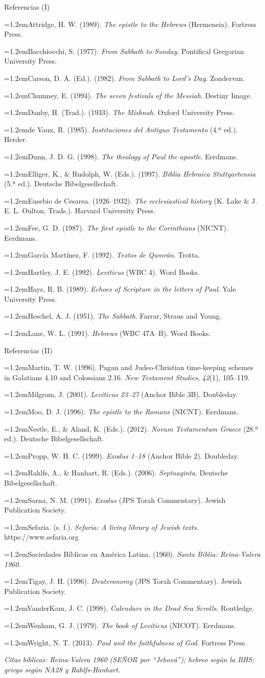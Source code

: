 \documentclass[hyperref={bookmarks=false},aspectratio=169]{beamer}
\newcommand{\SENOR}{S{\fontsize{0.78em}{1em}\selectfont EÑOR}}
\newcommand{\refapa}[1]{\par{\RaggedRight\hangindent=1.2em\hangafter=1\noindent #1\par}\vspace{3pt}}
\begin{document}
\begin{frame}{Referencias (I)}
\tiny
\refapa{Attridge, H. W. (1989). \emph{The epistle to the Hebrews} (Hermeneia). Fortress Press.}
\refapa{Bacchiocchi, S. (1977). \emph{From Sabbath to Sunday}. Pontifical Gregorian University Press.}
\refapa{Carson, D. A. (Ed.). (1982). \emph{From Sabbath to Lord's Day}. Zondervan.}
\refapa{Chumney, E. (1994). \emph{The seven festivals of the Messiah}. Destiny Image.}
\refapa{Danby, H. (Trad.). (1933). \emph{The Mishnah}. Oxford University Press.}
\refapa{de Vaux, R. (1985). \emph{Instituciones del Antiguo Testamento} (4.ª ed.). Herder.}
\refapa{Dunn, J. D. G. (1998). \emph{The theology of Paul the apostle}. Eerdmans.}
\refapa{Elliger, K., \& Rudolph, W. (Eds.). (1997). \emph{Biblia Hebraica Stuttgartensia} (5.ª ed.). Deutsche Bibelgesellschaft.}
\refapa{Eusebio de Cesarea. (1926--1932). \emph{The ecclesiastical history} (K. Lake \& J. E. L. Oulton, Trads.). Harvard University Press.}
\refapa{Fee, G. D. (1987). \emph{The first epistle to the Corinthians} (NICNT). Eerdmans.}
\refapa{García Martínez, F. (1992). \emph{Textos de Qumrán}. Trotta.}
\refapa{Hartley, J. E. (1992). \emph{Leviticus} (WBC 4). Word Books.}
\refapa{Hays, R. B. (1989). \emph{Echoes of Scripture in the letters of Paul}. Yale University Press.}
\refapa{Heschel, A. J. (1951). \emph{The Sabbath}. Farrar, Straus and Young.}
\refapa{Lane, W. L. (1991). \emph{Hebrews} (WBC 47A--B). Word Books.}
\end{frame}

\begin{frame}{Referencias (II)}
\tiny
\refapa{Martin, T. W. (1996). Pagan and Judeo-Christian time-keeping schemes in Galatians 4.10 and Colossians 2.16. \emph{New Testament Studies}, \emph{42}(1), 105--119.}
\refapa{Milgrom, J. (2001). \emph{Leviticus 23--27} (Anchor Bible 3B). Doubleday.}
\refapa{Moo, D. J. (1996). \emph{The epistle to the Romans} (NICNT). Eerdmans.}
\refapa{Nestle, E., \& Aland, K. (Eds.). (2012). \emph{Novum Testamentum Graece} (28.ª ed.). Deutsche Bibelgesellschaft.}
\refapa{Propp, W. H. C. (1999). \emph{Exodus 1--18} (Anchor Bible 2). Doubleday.}
\refapa{Rahlfs, A., \& Hanhart, R. (Eds.). (2006). \emph{Septuaginta}. Deutsche Bibelgesellschaft.}
\refapa{Sarna, N. M. (1991). \emph{Exodus} (JPS Torah Commentary). Jewish Publication Society.}
\refapa{Sefaria. (s. f.). \emph{Sefaria: A living library of Jewish texts}. https://www.sefaria.org}
\refapa{Sociedades Bíblicas en América Latina. (1960). \emph{Santa Biblia: Reina-Valera 1960}.}
\refapa{Tigay, J. H. (1996). \emph{Deuteronomy} (JPS Torah Commentary). Jewish Publication Society.}
\refapa{VanderKam, J. C. (1998). \emph{Calendars in the Dead Sea Scrolls}. Routledge.}
\refapa{Wenham, G. J. (1979). \emph{The book of Leviticus} (NICOT). Eerdmans.}
\refapa{Wright, N. T. (2013). \emph{Paul and the faithfulness of God}. Fortress Press.}
\par\medskip
\scriptsize\textit{Citas bíblicas: Reina-Valera 1960 (\SENOR{} por ``Jehová''); hebreo según la BHS; griego según NA28 y Rahlfs-Hanhart.}
\end{frame}
\end{document}
